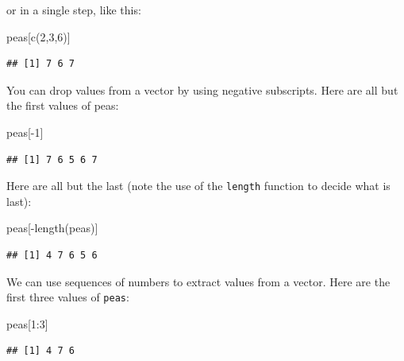 \documentclass[
]{book}
\newenvironment{Shaded}{\begin{snugshade}}{\end{snugshade}}
\newcommand{\DecValTok}[1]{\textcolor[rgb]{0.00,0.00,0.81}{#1}}
\newcommand{\FunctionTok}[1]{\textcolor[rgb]{0.00,0.00,0.00}{#1}}
\newcommand{\NormalTok}[1]{#1}
\newcommand{\SpecialCharTok}[1]{\textcolor[rgb]{0.00,0.00,0.00}{#1}}
\begin{document}
or in a single step, like this:

\begin{Shaded}
\begin{Highlighting}[]
\NormalTok{peas[}\FunctionTok{c}\NormalTok{(}\DecValTok{2}\NormalTok{,}\DecValTok{3}\NormalTok{,}\DecValTok{6}\NormalTok{)]}
\end{Highlighting}
\end{Shaded}

\begin{verbatim}
## [1] 7 6 7
\end{verbatim}

You can drop values from a vector by using negative subscripts. Here are all but the first values of peas:

\begin{Shaded}
\begin{Highlighting}[]
\NormalTok{peas[}\SpecialCharTok{{-}}\DecValTok{1}\NormalTok{]}
\end{Highlighting}
\end{Shaded}

\begin{verbatim}
## [1] 7 6 5 6 7
\end{verbatim}

Here are all but the last (note the use of the \texttt{length} function to decide what is last):

\begin{Shaded}
\begin{Highlighting}[]
\NormalTok{peas[}\SpecialCharTok{{-}}\FunctionTok{length}\NormalTok{(peas)]}
\end{Highlighting}
\end{Shaded}

\begin{verbatim}
## [1] 4 7 6 5 6
\end{verbatim}

We can use sequences of numbers to extract values from a vector. Here are the first three values of \texttt{peas}:

\begin{Shaded}
\begin{Highlighting}[]
\NormalTok{peas[}\DecValTok{1}\SpecialCharTok{:}\DecValTok{3}\NormalTok{]}
\end{Highlighting}
\end{Shaded}

\begin{verbatim}
## [1] 4 7 6
\end{verbatim}
\end{document}
